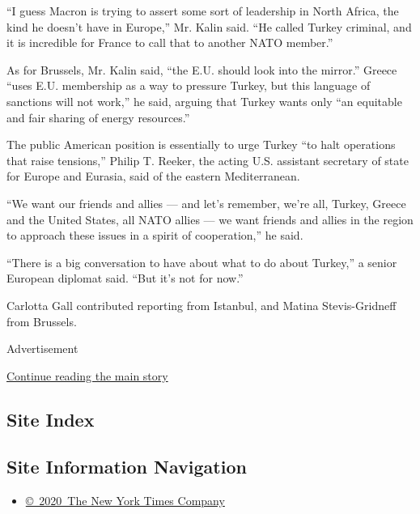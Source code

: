 ``I guess Macron is trying to assert some sort of leadership in North
Africa, the kind he doesn't have in Europe,'' Mr. Kalin said. ``He
called Turkey criminal, and it is incredible for France to call that to
another NATO member.''

As for Brussels, Mr. Kalin said, ``the E.U. should look into the
mirror.'' Greece ``uses E.U. membership as a way to pressure Turkey, but
this language of sanctions will not work,'' he said, arguing that Turkey
wants only ``an equitable and fair sharing of energy resources.''

The public American position is essentially to urge Turkey ``to halt
operations that raise tensions,'' Philip T. Reeker, the acting U.S.
assistant secretary of state for Europe and Eurasia, said of the eastern
Mediterranean.

``We want our friends and allies --- and let's remember, we're all,
Turkey, Greece and the United States, all NATO allies --- we want
friends and allies in the region to approach these issues in a spirit of
cooperation,'' he said.

``There is a big conversation to have about what to do about Turkey,'' a
senior European diplomat said. ``But it's not for now.''

Carlotta Gall contributed reporting from Istanbul, and Matina
Stevis-Gridneff from Brussels.

Advertisement

\protect\hyperlink{after-bottom}{Continue reading the main story}

\hypertarget{site-index}{%
\subsection{Site Index}\label{site-index}}

\hypertarget{site-information-navigation}{%
\subsection{Site Information
Navigation}\label{site-information-navigation}}

\begin{itemize}
\tightlist
\item
  \href{https://help.nytimes.com/hc/en-us/articles/115014792127-Copyright-notice}{©~2020~The
  New York Times Company}
\end{itemize}

